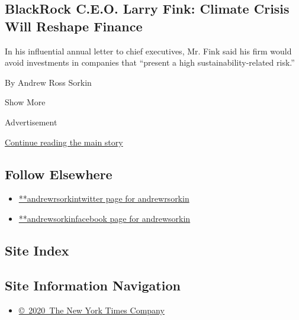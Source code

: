 \begin{enumerate}
  \hypertarget{blackrock-ceo-larry-fink-climate-crisis-will-reshape-finance}{%
  \subsection{BlackRock C.E.O. Larry Fink: Climate Crisis Will Reshape
  Finance}\label{blackrock-ceo-larry-fink-climate-crisis-will-reshape-finance}}

  In his influential annual letter to chief executives, Mr. Fink said
  his firm would avoid investments in companies that ``present a high
  sustainability-related risk.''

  By Andrew Ross Sorkin
\end{enumerate}

Show More

Advertisement

\protect\hyperlink{after-mid2}{Continue reading the main story}

\hypertarget{follow-elsewhere}{%
\subsection{Follow Elsewhere}\label{follow-elsewhere}}

\begin{itemize}
\tightlist
\item
  \href{https://twitter.com/andrewrsorkin}{**andrewrsorkintwitter page
  for andrewrsorkin}
\item
  \href{https://www.facebook.com/andrewsorkin}{**andrewsorkinfacebook
  page for andrewsorkin}
\end{itemize}

\hypertarget{site-index}{%
\subsection{Site Index}\label{site-index}}

\hypertarget{site-information-navigation}{%
\subsection{Site Information
Navigation}\label{site-information-navigation}}

\begin{itemize}
\tightlist
\item
  \href{https://help.nytimes.com/hc/en-us/articles/115014792127-Copyright-notice}{©~2020~The
  New York Times Company}
\end{itemize}

